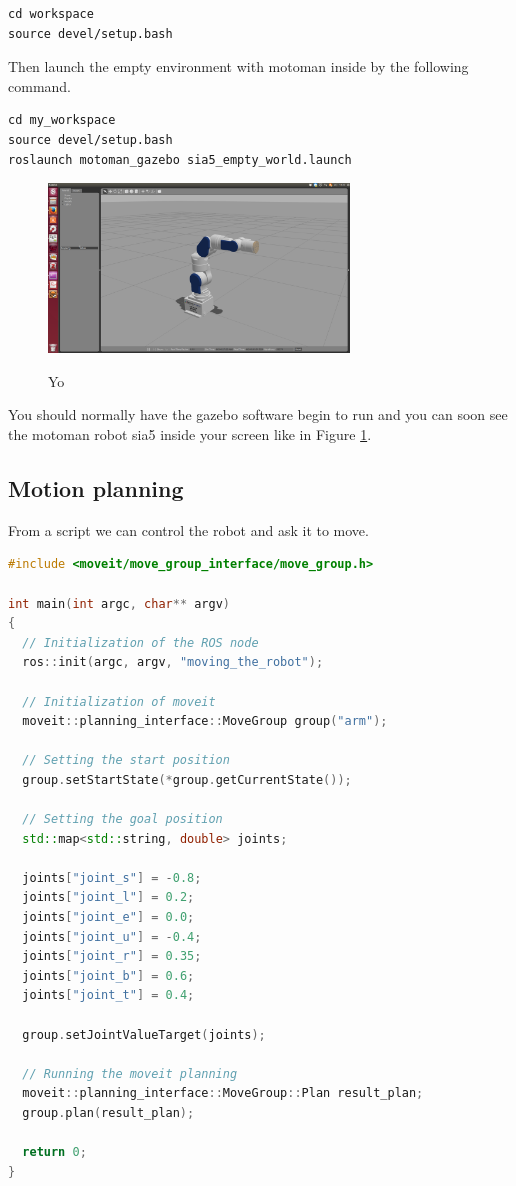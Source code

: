 \begin{lstlisting}
cd workspace
source devel/setup.bash
\end{lstlisting}

Then launch the empty environment with motoman inside by the following command.

\begin{lstlisting}
cd my_workspace
source devel/setup.bash
roslaunch motoman_gazebo sia5_empty_world.launch
\end{lstlisting}
\begin{figure}
\includegraphics[width=8cm]{images/utilisation/launch_gazebo.png}
\centering
\label{fig:launch_gazebo}
\caption{Yo}
\end{figure}
You should normally have the gazebo software begin to run and you can soon see the motoman robot sia5 inside your screen like in Figure \ref{fig:launch_gazebo}.

\subsection{Motion planning}

From a script we can control the robot and ask it to move. 

\begin{lstlisting}[language=c++]
#include <moveit/move_group_interface/move_group.h>

int main(int argc, char** argv)
{
  // Initialization of the ROS node
  ros::init(argc, argv, "moving_the_robot");

  // Initialization of moveit 
  moveit::planning_interface::MoveGroup group("arm");

  // Setting the start position
  group.setStartState(*group.getCurrentState());

  // Setting the goal position
  std::map<std::string, double> joints;
      
  joints["joint_s"] = -0.8;
  joints["joint_l"] = 0.2;
  joints["joint_e"] = 0.0;
  joints["joint_u"] = -0.4;
  joints["joint_r"] = 0.35;
  joints["joint_b"] = 0.6;
  joints["joint_t"] = 0.4;
      
  group.setJointValueTarget(joints);

  // Running the moveit planning
  moveit::planning_interface::MoveGroup::Plan result_plan;
  group.plan(result_plan);
  
  return 0;
}
\end{lstlisting}

